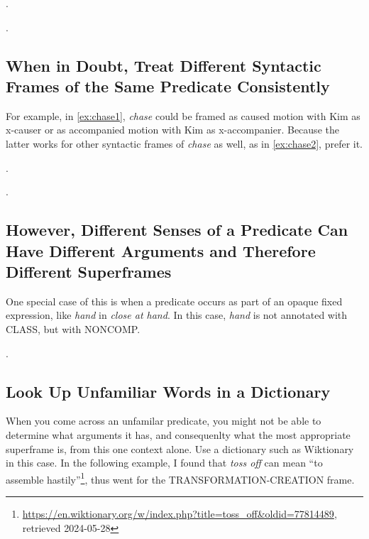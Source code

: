 \documentclass[a4paper]{article}
\newcommand{\fr}[1]{\textsf{#1}}
\newcommand{\rl}[1]{\textsf{#1}}
\begin{document}
\ex.\label{ex:high1}

\ex.\label{ex:high2}


\newpage\subsection{When in Doubt, Treat Different Syntactic Frames of the Same Predicate Consistently}

For example, in \ref{ex:chase1}, \emph{chase} could be framed as caused motion
with Kim as \rl{x-causer} or as accompanied motion with Kim as
\rl{x-accompanier}. Because the latter works for other syntactic frames of
\emph{chase} as well, as in \ref{ex:chase2}, prefer it.

\ex.\label{ex:chase1}

\ex.\label{ex:chase2}


\newpage\subsection{However, Different Senses of a Predicate Can Have Different Arguments and Therefore Different Superframes}

One special case of this is when a predicate occurs as part of an opaque fixed
expression, like \emph{hand} in \emph{close at hand}. In this case, \emph{hand}
is not annotated with \fr{CLASS}, but with \fr{NONCOMP}.

\ex.


\newpage\subsection{Look Up Unfamiliar Words in a Dictionary}

When you come across an unfamilar predicate, you might not be able to determine
what arguments it has, and consequenlty what the most appropriate superframe is,
from this one context alone. Use a dictionary such as Wiktionary in this case.
In the following example, I found that \emph{toss off} can mean ``to assemble
hastily''\footnote{\url{https://en.wiktionary.org/w/index.php?title=toss\_off\&oldid=77814489}, retrieved 2024-05-28},
thus went for the \fr{TRANSFORMATION-CREATION} frame.
\end{document}
